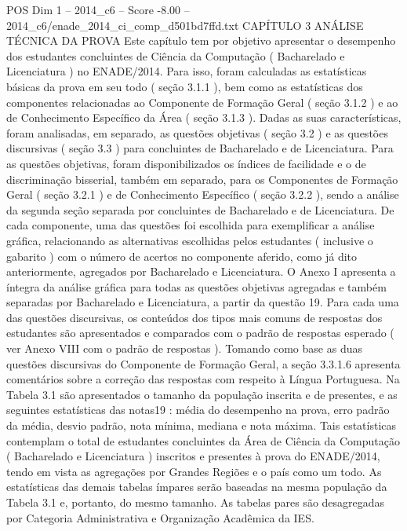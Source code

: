 \begin{textsample}{POS Dim 1 – 2014\_c6 – Score -8.00 – 2014\_c6/enade\_2014\_ci\_comp\_d501bd7ffd.txt}  \label{ex:f1_pos_430}
CAPÍTULO 3 ANÁLISE TÉCNICA DA PROVA Este capítulo tem por objetivo apresentar o desempenho dos estudantes concluintes de Ciência da Computação ( Bacharelado e Licenciatura ) no ENADE/2014.
Para isso, foram calculadas as estatísticas básicas da prova em seu todo ( seção 3.1.1 ), bem como as estatísticas dos componentes relacionadas ao Componente de Formação Geral ( seção 3.1.2 ) e ao de Conhecimento Específico da Área ( seção 3.1.3 ).
Dadas as suas características, foram analisadas, em separado, as questões objetivas ( seção 3.2 ) e as questões discursivas ( seção 3.3 ) para concluintes de Bacharelado e de Licenciatura.
Para as questões objetivas, foram disponibilizados os índices de facilidade e o de discriminação bisserial, também em separado, para os Componentes de Formação Geral ( seção 3.2.1 ) e de Conhecimento Específico ( seção 3.2.2 ), sendo a análise da segunda seção separada por concluintes de Bacharelado e de Licenciatura.
De cada componente, uma das questões foi escolhida para exemplificar a análise gráfica, relacionando as alternativas escolhidas pelos estudantes ( inclusive o gabarito ) com o número de acertos no componente aferido, como já dito anteriormente, agregados por Bacharelado e Licenciatura.
O Anexo I apresenta a íntegra da análise gráfica para todas as questões objetivas agregadas e também separadas por Bacharelado e Licenciatura, a partir da questão 19.
Para cada uma das questões discursivas, os conteúdos dos tipos mais comuns de respostas dos estudantes são apresentados e comparados com o padrão de respostas esperado ( ver Anexo VIII com o padrão de respostas ).
Tomando como base as duas questões discursivas do Componente de Formação Geral, a seção 3.3.1.6 apresenta comentários sobre a correção das respostas com respeito à Língua Portuguesa.
Na Tabela 3.1 são apresentados o tamanho da população inscrita e de presentes, e as seguintes estatísticas das notas19 : média do desempenho na prova, erro padrão da média, desvio padrão, nota mínima, mediana e nota máxima.
Tais estatísticas contemplam o total de estudantes concluintes da Área de Ciência da Computação ( Bacharelado e Licenciatura ) inscritos e presentes à prova do ENADE/2014, tendo em vista as agregações por Grandes Regiões e o país como um todo.
As estatísticas das demais tabelas ímpares serão baseadas na mesma população da Tabela 3.1 e, portanto, do mesmo tamanho.
As tabelas pares são desagregadas por Categoria Administrativa e Organização Acadêmica da IES.

\end{textsample}
